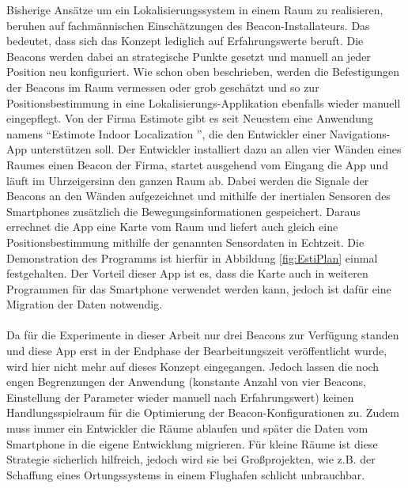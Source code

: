 Bisherige Ansätze um ein Lokalisierungssystem in einem Raum zu realisieren, beruhen auf fachmännischen Einschätzungen des Beacon-Installateurs. Das bedeutet, dass sich das Konzept lediglich auf Erfahrungswerte beruft. Die Beacons werden dabei an strategische Punkte gesetzt und manuell an jeder Position neu konfiguriert. Wie schon oben beschrieben, werden die Befestigungen der Beacons im Raum vermessen oder grob geschätzt und so zur Positionsbestimmung in eine Lokalisierungs-Applikation ebenfalls wieder manuell eingepflegt. Von der Firma Estimote gibt es seit Neuestem eine Anwendung namens "`Estimote Indoor Localization "', die den Entwickler einer Navigations-App unterstützen soll. Der Entwickler installiert dazu an allen vier Wänden eines Raumes einen Beacon der Firma, startet ausgehend vom Eingang die App und läuft im Uhrzeigersinn den ganzen Raum ab. Dabei werden die Signale der Beacons an den Wänden aufgezeichnet und mithilfe der inertialen Sensoren des Smartphones zusätzlich die Bewegungsinformationen gespeichert. Daraus errechnet die App eine Karte vom Raum und liefert auch gleich eine Positionsbestimmung mithilfe der genannten Sensordaten in Echtzeit. Die Demonstration des Programms ist hierfür in Abbildung \ref{fig:EstiPlan} einmal festgehalten. Der Vorteil dieser App ist es, dass die Karte auch in weiteren Programmen für das Smartphone verwendet werden kann, jedoch ist dafür eine Migration der Daten notwendig. \\ \\
Da für die Experimente in dieser Arbeit nur drei Beacons zur Verfügung standen und diese App erst in der Endphase der Bearbeitungszeit veröffentlicht wurde, wird hier nicht mehr auf dieses Konzept eingegangen. Jedoch lassen die noch engen Begrenzungen der Anwendung (konstante Anzahl von vier Beacons, Einstellung der Parameter wieder manuell nach Erfahrungswert) keinen Handlungsspielraum für die Optimierung der Beacon-Konfigurationen zu. Zudem muss immer ein Entwickler die Räume ablaufen und später die Daten vom Smartphone in die eigene Entwicklung migrieren. Für kleine Räume ist diese Strategie sicherlich hilfreich, jedoch wird sie bei Großprojekten, wie z.B. der Schaffung eines Ortungssystems in einem Flughafen schlicht unbrauchbar.